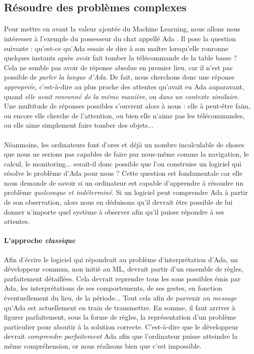 \subsection*{Résoudre des problèmes complexes}

\paragraph{} Pour mettre en avant la valeur ajoutée du Machine Learning, nous allons nous intéresser à l'exemple
du possesseur du chat appellé Ada \cite{MachineLearning0}. Il pose la question suivante : qu'est-ce qu'Ada essaie de dire
à son maître lorsqu'elle ronronne quelques instants après avoir fait tomber la télécommande de la table basse ? Cela ne semble
pas avoir de réponse absolue en premier lieu, car il n'est pas possible de \emph{parler la langue d'Ada}. De fait, nous cherchons
donc une réponse \emph{appropriée}, c'est-à-dire au plus proche des attentes qu'avait eu
Ada auparavant, quand \emph{elle avait ronronné de la même manière}, ou \emph{dans un contexte similaire}. Une multitude de réponses
possibles s'ouvrent alors à nous : elle à peut-être faim, ou encore elle cherche de l'attention, ou bien elle n'aime pas les
télécommandes, ou elle aime simplement faire tomber des objets...

\paragraph{} Néanmoins, les ordinateurs font d'ores et déjà un nombre incalculable de choses que nous ne serions pas capables de faire
par nous-même comme la navigation, le calcul, le monitoring... serait-il donc possible que l'on construise un logiciel qui résolve le problème
d'Ada pour nous ? Cette question est fondamentale car elle nous demande de savoir si un ordinateur est capable d'apprendre à résoudre un
problème \emph{quelconque et indéterminé}. Si un logiciel peut comprendre Ada à partir de son observation, alors nous en déduisons qu'il devrait
être possible de lui donner n'importe quel système à observer afin qu'il puisse répondre à ses attentes.   

\paragraph{L'approche \emph{classique}} Afin d'écrire le logiciel qui répondrait au problème d'interprétation d'Ada, un développeur commun,
non initié au ML, devrait partir d'un ensemble de règles, parfaitement détaillées. Cela devrait reprendre tous les sons possibles émis par Ada,
les interprétations de ses comportements, de ses gestes, en fonction éventuellement du lieu, de la période... Tout cela afin de parvenir au 
\emph{message} qu'Ada est actuellement en train de transmettre. En somme, il faut arriver à figurer parfaitement, sous la forme de règles,
la représentation d'un problème particulier pour aboutir à la solution correcte. C'est-à-dire que le développeur devrait \emph{comprendre parfaitement}
Ada afin que l'ordinateur puisse atteindre la même compréhension, or nous réalisons bien que c'est impossible.

